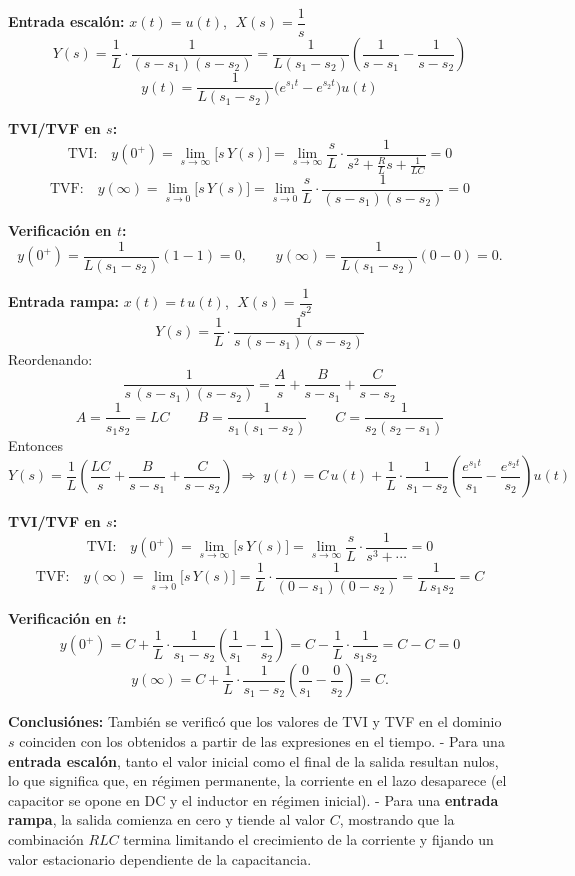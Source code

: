 \textbf{Entrada escalón:} \(x(t)=u(t)\), \(\;X(s)=\dfrac{1}{s}\)
\[
Y(s)=\frac{1}{L}\cdot\frac{1}{(s-s_1)(s-s_2)}
=\frac{1}{L(s_1-s_2)}\!\left(\frac{1}{s-s_1}-\frac{1}{s-s_2}\right)
\]
\[
y(t)=\frac{1}{L(s_1-s_2)}\big(e^{s_1 t}-e^{s_2 t}\big)u(t)
\]

\textbf{TVI/TVF en \(s\):}
\[
\text{TVI:}\quad y(0^+)=\lim_{s\to\infty}\big[s\,Y(s)\big]
=\lim_{s\to\infty}\frac{s}{L}\cdot\frac{1}{s^2+\tfrac{R}{L}s+\tfrac{1}{LC}}=0
\]
\[
\text{TVF:}\quad y(\infty)=\lim_{s\to 0}\big[s\,Y(s)\big]
=\lim_{s\to 0}\frac{s}{L}\cdot\frac{1}{(s-s_1)(s-s_2)}=0
\]

\textbf{Verificación en \(t\):}
\[
y(0^+)=\frac{1}{L(s_1-s_2)}(1-1)=0,\qquad
y(\infty)=\frac{1}{L(s_1-s_2)}(0-0)=0.
\]

\medskip

\textbf{Entrada rampa:} \(x(t)=t\,u(t)\), \(\;X(s)=\dfrac{1}{s^2}\)
\[
Y(s)=\frac{1}{L}\cdot\frac{1}{s\,(s-s_1)(s-s_2)}
\]
Reordenando:
\[
\frac{1}{s\,(s-s_1)(s-s_2)}=\frac{A}{s}+\frac{B}{s-s_1}+\frac{C}{s-s_2}
\]
\[
A=\frac{1}{s_1 s_2}=LC\qquad
B=\frac{1}{s_1(s_1-s_2)}\qquad
C=\frac{1}{s_2(s_2-s_1)}
\]
Entonces
\[
Y(s)=\frac{1}{L}\left(\frac{LC}{s}+\frac{B}{s-s_1}+\frac{C}{s-s_2}\right)
\;\Rightarrow\;
y(t)=C\,u(t)+\frac{1}{L}\cdot\frac{1}{s_1-s_2}\!\left(\frac{e^{s_1 t}}{s_1}-\frac{e^{s_2 t}}{s_2}\right)\!u(t)
\]

\textbf{TVI/TVF en \(s\):}
\[
\text{TVI:}\quad y(0^+)=\lim_{s\to\infty}\big[s\,Y(s)\big]
=\lim_{s\to\infty}\frac{s}{L}\cdot\frac{1}{s^3+\cdots}=0
\]
\[
\text{TVF:}\quad y(\infty)=\lim_{s\to 0}\big[s\,Y(s)\big]
=\frac{1}{L}\cdot\frac{1}{(0-s_1)(0-s_2)}=\frac{1}{L\,s_1 s_2}=C
\]

\textbf{Verificación en \(t\):}
\[
y(0^+)=C+\frac{1}{L}\cdot\frac{1}{s_1-s_2}\!\left(\frac{1}{s_1}-\frac{1}{s_2}\right)
=C-\frac{1}{L}\cdot\frac{1}{s_1 s_2}=C-C=0
\]
\[
y(\infty)=C+\frac{1}{L}\cdot\frac{1}{s_1-s_2}\!\left(\frac{0}{s_1}-\frac{0}{s_2}\right)=C.
\]

\textbf{Conclusiónes:}  
También se verificó que los valores de TVI y TVF en el dominio $s$ coinciden con los obtenidos a partir de las expresiones en el tiempo.  
- Para una \textbf{entrada escalón}, tanto el valor inicial como el final de la salida resultan nulos, lo que significa que, en régimen permanente, la corriente en el lazo desaparece (el capacitor se opone en DC y el inductor en régimen inicial).  
- Para una \textbf{entrada rampa}, la salida comienza en cero y tiende al valor $C$, mostrando que la combinación $RLC$ termina limitando el crecimiento de la corriente y fijando un valor estacionario dependiente de la capacitancia.  

